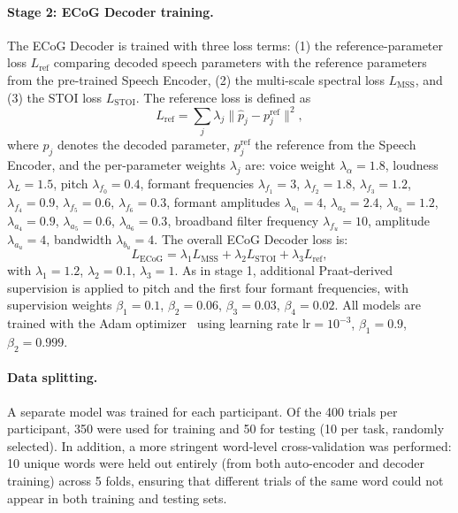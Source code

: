 \documentclass[10pt]{article}
\begin{document}
\paragraph{Stage 2: ECoG Decoder training.}
The ECoG Decoder is trained with three loss terms: (1) the reference-parameter loss $L_{\mathrm{ref}}$ comparing decoded speech parameters with the reference parameters from the pre-trained Speech Encoder, (2) the multi-scale spectral loss $L_{\mathrm{MSS}}$, and (3) the STOI loss $L_{\mathrm{STOI}}$. The reference loss is defined as
\begin{equation}
L_{\mathrm{ref}} = \sum_j \lambda_j \| \hat{p}_j - p_j^{\mathrm{ref}} \|^2,
\end{equation}
where $\hat{p}_j$ denotes the decoded parameter, $p_j^{\mathrm{ref}}$ the reference from the Speech Encoder, and the per-parameter weights $\lambda_j$ are: voice weight $\lambda_\alpha=1.8$, loudness $\lambda_L=1.5$, pitch $\lambda_{f_0}=0.4$, formant frequencies $\lambda_{f_1}=3$, $\lambda_{f_2}=1.8$, $\lambda_{f_3}=1.2$, $\lambda_{f_4}=0.9$, $\lambda_{f_5}=0.6$, $\lambda_{f_6}=0.3$, formant amplitudes $\lambda_{a_1}=4$, $\lambda_{a_2}=2.4$, $\lambda_{a_3}=1.2$, $\lambda_{a_4}=0.9$, $\lambda_{a_5}=0.6$, $\lambda_{a_6}=0.3$, broadband filter frequency $\lambda_{f_u}=10$, amplitude $\lambda_{a_u}=4$, bandwidth $\lambda_{b_u}=4$. The overall ECoG Decoder loss is:
\begin{equation}
L_{\mathrm{ECoG}} = \lambda_1 L_{\mathrm{MSS}} + \lambda_2 L_{\mathrm{STOI}} + \lambda_3 L_{\mathrm{ref}},
\end{equation}
with $\lambda_1=1.2$, $\lambda_2=0.1$, $\lambda_3=1$. As in stage 1, additional Praat-derived supervision is applied to pitch and the first four formant frequencies, with supervision weights $\beta_1=0.1$, $\beta_2=0.06$, $\beta_3=0.03$, $\beta_4=0.02$. All models are trained with the Adam optimizer~\cite{kingma2015adam} using learning rate $\mathrm{lr}=10^{-3}$, $\beta_1=0.9$, $\beta_2=0.999$.

\paragraph{Data splitting.}
A separate model was trained for each participant. Of the 400 trials per participant, 350 were used for training and 50 for testing (10 per task, randomly selected). In addition, a more stringent word-level cross-validation was performed: 10 unique words were held out entirely (from both auto-encoder and decoder training) across 5 folds, ensuring that different trials of the same word could not appear in both training and testing sets.
\end{document}
